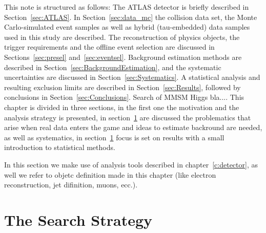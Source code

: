 This note is structured as follows: The ATLAS detector is briefly
described in Section~\ref{sec:ATLAS}. In Section~\ref{sec:data_mc} the
collision data set, the Monte Carlo-simulated event samples as well as
hybrid (tau-embedded) data samples used in this study are
described. The reconstruction of physics objects, the trigger
requirements and the offline event selection are discussed in
Sections~\ref{sec:presel} and~\ref{sec:eventsel}. Background estimation methods are
described in Section~\ref{sec:BackgroundEstimation}, and the
systematic uncertainties are discussed in
Section~\ref{sec:Systematics}. A statistical analysis and resulting
exclusion limits are described in Section~\ref{sec:Results}, followed
by conclusions in Section~\ref{sec:Conclusions}.
Search of MMSM Higgs bla....
This chapter is divided in three sections, in the first one the motivation and the 
analysis strategy is presented, in section~\ref{} are discussed the problematics 
that arise when real data enters the game and ideas to estimate backround are needed, 
as well as systematics, in section~\ref{}  focus is set on results with a small introduction to
statistical methods.


In this section we make use of analysis tools described in chapter~\ref{c:detector}, as well
we refer to objetc definition made in this chapter (like electron reconstruction, jet difinition, muons, ecc.).

\section{The Search Strategy}

